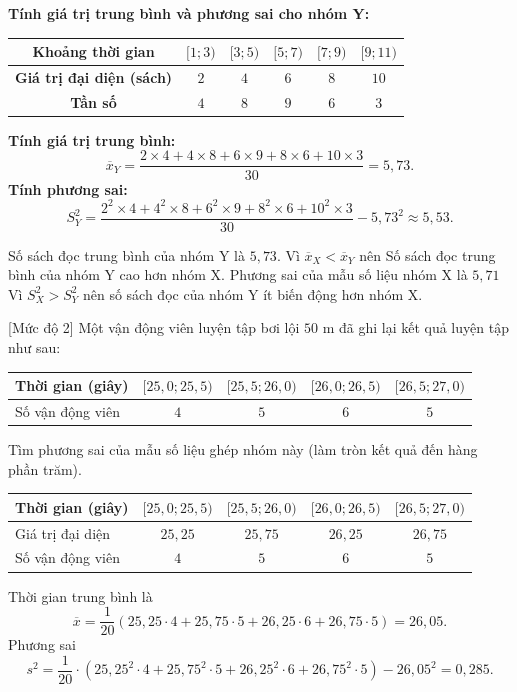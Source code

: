 \begin{ex}
{\textbf{Tính giá trị trung bình và phương sai cho nhóm Y:}
\begin{center}
\begin{tabular}{|c|c|c|c|c|c|}
\hline \textbf{Khoảng thời gian} & $[1; 3)$ & $[3; 5)$ & $[5; 7)$ & $[7; 9)$ & $[9; 11)$ \\
\hline \textbf{Giá trị đại diện (sách)} & $2$ & $4$ & $6$ & $8$ & $10$ \\
\hline \textbf{Tần số} & $4$ & $8$ & $9$ & $6$ & $3$ \\
\hline
\end{tabular}
\end{center}
\textbf{Tính giá trị trung bình:}
$$\overline{x}_Y = \frac{2 \times 4 + 4 \times 8 + 6 \times 9 + 8 \times 6 + 10 \times 3}{30} = 5{,}73.$$
\textbf{Tính phương sai:}
$$S^2_Y = \frac{2^2 \times 4 + 4^2 \times 8 + 6^2 \times 9 + 8^2 \times 6 + 10^2 \times 3}{30} - 5{,}73^2 \approx 5{,}53.$$
\begin{itemchoice}
\itemch Số sách đọc trung bình của nhóm Y là $5{,}73$.
\itemch Vì $\overline{x}_X<\overline{x}_Y$ nên Số sách đọc trung bình của nhóm Y cao hơn nhóm X.
\itemch Phương sai của mẫu số liệu nhóm X là $5{,}71$
\itemch Vì $S^2_X>S^2_Y$ nên số sách đọc của nhóm Y ít biến động hơn nhóm X.
\end{itemchoice}
}
\end{ex}

\begin{bt}%
[Mức độ 2]%
Một vận động viên luyện tập bơi lội $50$ m đã ghi lại kết quả luyện tập như sau:
\begin{center}
\begin{tabular}{|l|c|c|c|c|}
\hline Thời gian (giây) & {$[25{,}0; 25{,}5)$} & {$[25{,}5; 26{,}0)$} & {$[26{,}0; 26{,}5)$} & {$[26{,}5; 27{,}0)$} \\
\hline Số vận động viên & $4$ & $5$ & $6$ & $5$ \\
\hline
\end{tabular}
\end{center}
Tìm phương sai của mẫu số liệu ghép nhóm này (làm tròn kết quả đến hàng phần trăm).
\loigiai
{
\begin{center}
\begin{tabular}{|l|c|c|c|c|}
\hline Thời gian (giây) & {$[25{,}0; 25{,}5)$} & {$[25{,}5; 26{,}0)$} & {$[26{,}0; 26{,}5)$} & {$[26{,}5; 27{,}0)$} \\
\hline Giá trị đại diện & $25{,}25$ & $25{,}75$ & $26{,}25$ & $26{,}75$ \\
\hline Số vận động viên & $4$ & $5$ & $6$ & $5$ \\
\hline
\end{tabular}
\end{center}
Thời gian trung bình là
$$\overline{x}=\dfrac{1}{20}(25{,}25\cdot4+25{,}75\cdot5+26{,}25\cdot6+26{,}75\cdot5)=26{,}05.$$
Phương sai
$$s^2=\dfrac{1}{20}\cdot\left(25{,}25^2\cdot4+25{,}75^2\cdot5+26{,}25^2\cdot6+26{,}75^2\cdot5\right)-26{,}05^2=0{,}285.$$
}
\end{bt}

